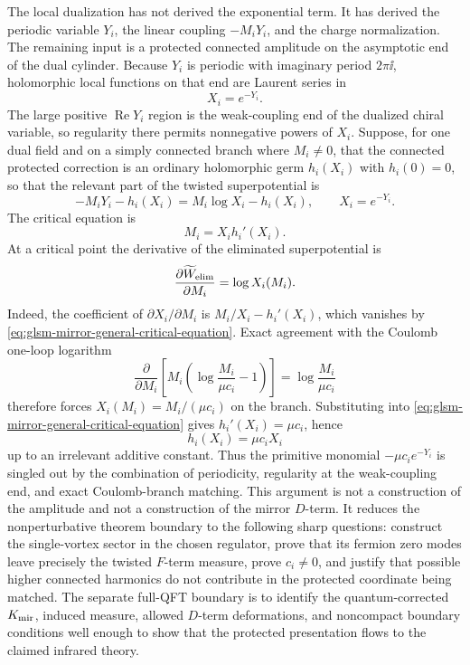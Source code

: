 The local dualization has not derived the exponential term.  It has derived
the periodic variable \(Y_i\), the linear coupling \(-M_iY_i\), and the charge
normalization.  The remaining input is a protected connected amplitude on the
asymptotic end of the dual cylinder.  Because \(Y_i\) is periodic with
imaginary period \(2\pi\ii\), holomorphic local functions on that end are
Laurent series in
\[
  X_i=e^{-Y_i}.
\]
The large positive \(\operatorname{Re}Y_i\) region is the weak-coupling end
of the dualized chiral variable, so regularity there permits nonnegative
powers of \(X_i\).  Suppose, for one dual field and on a simply connected
branch where \(M_i\neq0\), that the connected protected correction is an
ordinary holomorphic germ \(h_i(X_i)\) with \(h_i(0)=0\), so that the relevant
part of the twisted superpotential is
\begin{equation}
  -M_iY_i-h_i(X_i)
  =
  M_i\log X_i-h_i(X_i),
  \qquad X_i=e^{-Y_i}.
  \label{eq:glsm-mirror-general-holomorphic-correction}
\end{equation}
The critical equation is
\begin{equation}
  M_i=X_i h_i'(X_i).
  \label{eq:glsm-mirror-general-critical-equation}
\end{equation}
At a critical point the derivative of the eliminated superpotential is
\begin{equation}
  \frac{\partial \widetilde W_{\rm elim}}{\partial M_i}
  =
  \log X_i(M_i).
  \label{eq:glsm-mirror-eliminated-branch-derivative}
\end{equation}
Indeed, the coefficient of \(\partial X_i/\partial M_i\) is
\(M_i/X_i-h_i'(X_i)\), which vanishes by
\eqref{eq:glsm-mirror-general-critical-equation}.  Exact agreement with the
Coulomb one-loop logarithm
\[
  \frac{\partial}{\partial M_i}
  \left[
    M_i\left(\log\frac{M_i}{\mu c_i}-1\right)
  \right]
  =
  \log\frac{M_i}{\mu c_i}
\]
therefore forces \(X_i(M_i)=M_i/(\mu c_i)\) on the branch.  Substituting into
\eqref{eq:glsm-mirror-general-critical-equation} gives
\(h_i'(X_i)=\mu c_i\), hence
\[
  h_i(X_i)=\mu c_iX_i
\]
up to an irrelevant additive constant.  Thus the primitive monomial
\(-\mu c_i e^{-Y_i}\) is singled out by the combination of periodicity,
regularity at the weak-coupling end, and exact Coulomb-branch matching.  This
argument is not a construction of the amplitude and not a construction of the
mirror \(D\)-term.  It reduces the
nonperturbative theorem boundary to the following sharp questions: construct
the single-vortex sector in the chosen regulator, prove that its fermion zero
modes leave precisely the twisted \(F\)-term measure, prove
\(c_i\neq0\), and justify that possible higher connected harmonics do not
contribute in the protected coordinate being matched.  The separate full-QFT
boundary is to identify the quantum-corrected \(K_{\rm mir}\), induced
measure, allowed \(D\)-term deformations, and noncompact boundary conditions
well enough to show that the protected presentation flows to the claimed
infrared theory.

